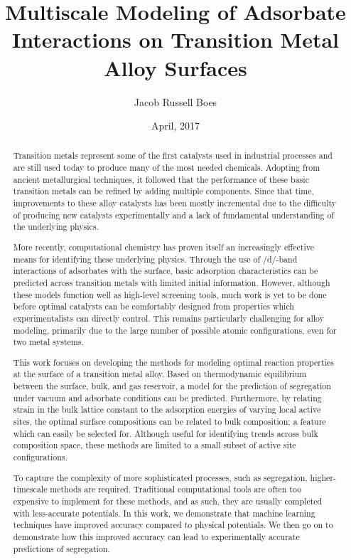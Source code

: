 \documentclass[12pt]{cmuthesis}
\author{Jacob Russell Boes}
\date{April, 2017}
\title{Multiscale Modeling of Adsorbate Interactions on Transition Metal Alloy Surfaces}
\begin{document}
\maketitle

\frontmatter
{}

\begin{abstract}
Transition metals represent some of the first catalysts used in industrial processes and are still used today to produce many of the most needed chemicals. Adopting from ancient metallurgical techniques, it followed that the performance of these basic transition metals can be refined by adding multiple components. Since that time, improvements to these alloy catalysts has been mostly incremental due to the difficulty of producing new catalysts experimentally and a lack of fundamental understanding of the underlying physics.

More recently, computational chemistry has proven itself an increasingly effective means for identifying these underlying physics. Through the use of /d/-band interactions of adsorbates with the surface, basic adsorption characteristics can be predicted across transition metals with limited initial information. However, although these models function well as high-level screening tools, much work is yet to be done before optimal catalysts can be comfortably designed from properties which experimentalists can directly control. This remains particularly challenging for alloy modeling, primarily due to the large number of possible atomic configurations, even for two metal systems.

This work focuses on developing the methods for modeling optimal reaction properties at the surface of a transition metal alloy. Based on thermodynamic equilibrium between the surface, bulk, and gas reservoir, a model for the prediction of segregation under vacuum and adsorbate conditions can be predicted. Furthermore, by relating strain in the bulk lattice constant to the adsorption energies of varying local active sites, the optimal surface compositions can be related to bulk composition; a feature which can easily be selected for. Although useful for identifying trends across bulk composition space, these methods are limited to a small subset of active site configurations.

To capture the complexity of more sophisticated processes, such as segregation, higher-timescale methods are required. Traditional computational tools are often too expensive to implement for these methods, and as such, they are usually completed with less-accurate potentials. In this work, we demonstrate that machine learning techniques have improved accuracy compared to physical potentials. We then go on to demonstrate how this improved accuracy can lead to experimentally accurate predictions of segregation.
\end{abstract}
\end{document}
